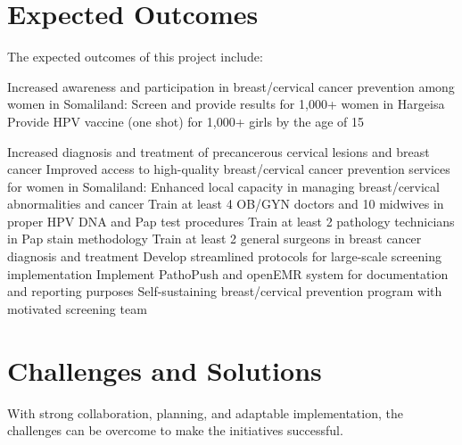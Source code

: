 \documentclass{article}
\begin{document}
\section{Expected Outcomes}
The expected outcomes of this project include: 
\begin{outline} 

\1 Increased awareness and participation in breast/cervical cancer prevention among women in Somaliland:
    \2 Screen and provide results for 1,000+ women in Hargeisa
    \2 Provide HPV vaccine (one shot) for 1,000+ girls by the age of 15

    \2 Increased diagnosis and treatment of precancerous cervical lesions and breast cancer
\1 Improved access to high-quality breast/cervical cancer prevention services for women in Somaliland:
    \2 Enhanced local capacity in managing breast/cervical abnormalities and cancer
    \2 Train at least 4 OB/GYN doctors and 10 midwives in proper HPV DNA and Pap test procedures
    \2 Train at least 2 pathology technicians in Pap stain methodology
    \2 Train at least 2 general surgeons in breast cancer diagnosis and treatment
    \2 Develop streamlined protocols for large-scale screening implementation
    \2 Implement PathoPush and openEMR system for documentation and reporting purposes
    \2 Self-sustaining breast/cervical prevention program with motivated screening team
\end{outline}






\section{Challenges and Solutions}
With strong collaboration, planning, and adaptable implementation, the challenges can be overcome to make the initiatives successful.
\end{document}
